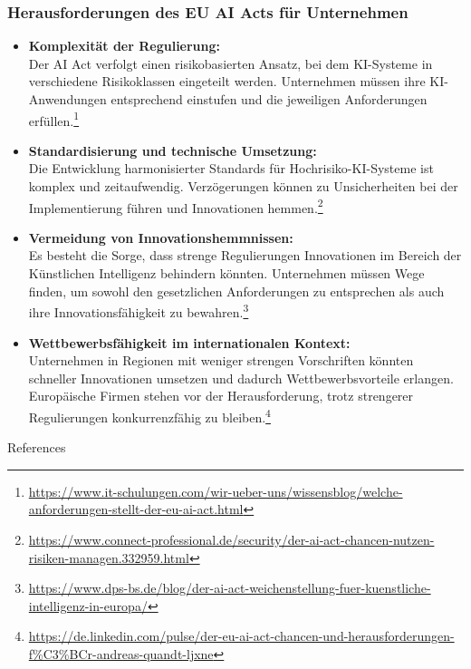 \documentclass[aspectratio=1610, xcolor=dvipsnames, 9pt]{beamer}
\begin{document}
\begin{frame}
    \frametitle{Herausforderungen des EU AI Acts für Unternehmen}

    \begin{itemize}
        \item \textbf{Komplexität der Regulierung:} \\
        Der AI Act verfolgt einen risikobasierten Ansatz, bei dem KI-Systeme in verschiedene Risikoklassen eingeteilt werden. Unternehmen müssen ihre KI-Anwendungen entsprechend einstufen und die jeweiligen Anforderungen erfüllen.\footnote{\url{https://www.it-schulungen.com/wir-ueber-uns/wissensblog/welche-anforderungen-stellt-der-eu-ai-act.html}}

        \item \textbf{Standardisierung und technische Umsetzung:} \\
        Die Entwicklung harmonisierter Standards für Hochrisiko-KI-Systeme ist komplex und zeitaufwendig. Verzögerungen können zu Unsicherheiten bei der Implementierung führen und Innovationen hemmen.\footnote{\url{https://www.connect-professional.de/security/der-ai-act-chancen-nutzen-risiken-managen.332959.html}}

        \item \textbf{Vermeidung von Innovationshemmnissen:} \\
        Es besteht die Sorge, dass strenge Regulierungen Innovationen im Bereich der Künstlichen Intelligenz behindern könnten. Unternehmen müssen Wege finden, um sowohl den gesetzlichen Anforderungen zu entsprechen als auch ihre Innovationsfähigkeit zu bewahren.\footnote{\url{https://www.dps-bs.de/blog/der-ai-act-weichenstellung-fuer-kuenstliche-intelligenz-in-europa/}}

        \item \textbf{Wettbewerbsfähigkeit im internationalen Kontext:} \\
        Unternehmen in Regionen mit weniger strengen Vorschriften könnten schneller Innovationen umsetzen und dadurch Wettbewerbsvorteile erlangen. Europäische Firmen stehen vor der Herausforderung, trotz strengerer Regulierungen konkurrenzfähig zu bleiben.\footnote{\url{https://de.linkedin.com/pulse/der-eu-ai-act-chancen-und-herausforderungen-f\%C3\%BCr-andreas-quandt-ljxne}}
    \end{itemize}

\end{frame}


\begin{frame}[allowframebreaks]{References}
 
 
\end{frame}
\end{document}
